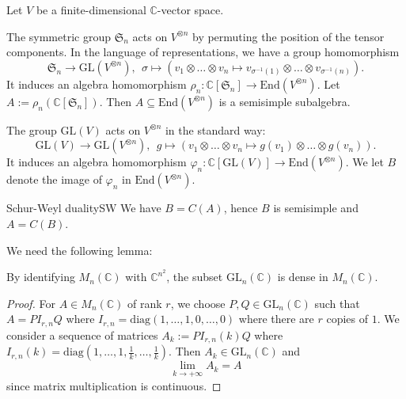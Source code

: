 \documentclass[twoside = false,	%
		headsepline,		%
		parskip = true,
		]{scrbook}						%
\begin{document}
        Let $V$ be a finite-dimensional $\mathbb{C}$-vector space. 
    
        The symmetric group $\mathfrak{S}_n$ acts on $V^{\otimes n}$ by permuting the position of the tensor components. In the language of representations, we have a group homomorphism 
        $$\mathfrak{S}_n\to\mathrm{GL}(V^{\otimes n}),\ \ \sigma\mapsto(v_1\otimes\ldots\otimes v_n\mapsto v_{\sigma^{-1}(1)}\otimes\ldots\otimes v_{\sigma^{-1}(n)}).$$
        It induces an algebra homomorphism $\rho_n:\mathbb{C}[\mathfrak{S}_n]\to\mathrm{End}(V^{\otimes n})$. Let $A:=\rho_n(\mathbb{C}[\mathfrak{S}_n])$. Then $A\subseteq\mathrm{End}(V^{\otimes n})$ is a semisimple subalgebra. 
    
        The group $\mathrm{GL}(V)$ acts on $V^{\otimes n}$ in the standard way:
        $$\mathrm{GL}(V)\to\mathrm{GL}(V^{\otimes n}),\ \ g\mapsto (v_1\otimes\ldots\otimes v_n\mapsto g(v_1)\otimes\ldots\otimes g(v_n)).$$
        It induces an algebra homomorphism $\varphi_n:\mathbb{C}[\mathrm{GL}(V)]\to\mathrm{End}(V^{\otimes n})$.
        We let $B$ denote the image of $\varphi_n$ in $\mathrm{End}(V^{\otimes n})$.
    
        \begin{theorem}{Schur-Weyl duality}{SW}
        We have $B=C(A)$, hence $B$ is semisimple and $A=C(B)$.
        \end{theorem}
    
        We need the following lemma:
    
        \begin{lemma*}{}
            By identifying $M_n(\mathbb{C})$ with $\mathbb{C}^{n^2}$, the subset $\mathrm{GL}_n(\mathbb{C})$ is dense in $M_n(\mathbb{C})$.
        \end{lemma*}
    
        \begin{proof}
            For $A\in M_n(\mathbb{C})$ of rank $r$, we choose $P,Q\in\mathrm{GL}_n(\mathbb{C})$ such that $A=PI_{r,n} Q$ where $I_{r,n}=\mathrm{diag}(1,\ldots,1,0,\ldots,0)$ where there are $r$ copies of $1$. We consider a sequence of matrices $A_k:=PI_{r,n}(k)Q$ where $I_{r,n}(k)=\mathrm{diag}(1,\ldots,1,\frac{1}{k},\ldots,\frac{1}{k})$. Then $A_k\in\mathrm{GL}_n(\mathbb{C})$ and 
            $$\lim_{k\to+\infty} A_k=A$$ 
            since matrix multiplication is continuous.
        \end{proof}
    
\end{document}
